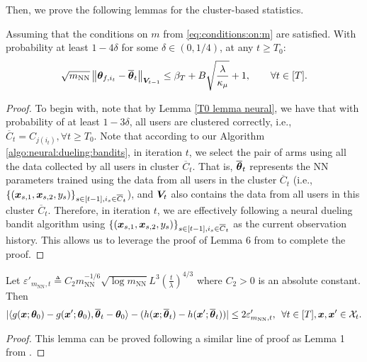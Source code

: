 Then, we prove the following lemmas for the cluster-based statistics.
\begin{lemma}\label{lemma:concentration:theta cluster:neural}
Assuming that the conditions on $m$ from \cref{eq:conditions:on:m} are satisfied.
With probability at least $1-4\delta$ for some $\delta\in(0,1/4)$, at any $t\geq T_0$:
\[
	\sqrt{m_{\text{NN}}} \left\| \boldsymbol{\theta}_{f,i_{t}} - \overline{\boldsymbol{\theta}}_{t} \right\|_{\boldsymbol{V}_{t-1}} \leq  \beta_T + B \sqrt{\frac{\lambda}{\kappa_\mu}} + 1, \qquad \forall t\in[T].
\]
\end{lemma}
\begin{proof}
To begin with, note that by Lemma \ref{T0 lemma neural}, we have that with probability of at least $1-3\delta$, all users are clustered correctly, i.e., $\overline{C}_t=C_{j(i_t)}, \forall t\geq T_0$.
Note that according to our Algorithm \ref{algo:neural:dueling:bandits}, in iteration $t$, we select the pair of arms using all the data collected by all users in cluster $\overline{C}_t$.
That is, $\overline{\boldsymbol{\theta}}_{t}$ represents the NN parameters trained using the data from all users in the cluster $\overline{C}_t$ (i.e., $\{(\boldsymbol{x}_{s,1}, \boldsymbol{x}_{s,2}, y_s)\}_{s\in[t-1], i_s\in \overline C_t}$), and $\boldsymbol{V}_t$ also contains the data from all users in this cluster $\overline{C}_t$.
Therefore, in iteration $t$, we are effectively following a neural dueling bandit algorithm using $\{(\boldsymbol{x}_{s,1}, \boldsymbol{x}_{s,2}, y_s)\}_{s\in[t-1], i_s\in \overline C_t}$ as the current observation history.
This allows us to leverage the proof of Lemma 6 from \citet{verma2024neural} to complete the proof.
\end{proof}

\begin{lemma}
\label{lemma:bound:approx:error:linear:nn:duel}
    Let $\varepsilon'_{m_{\text{NN}},t} \triangleq C_2 m_{\text{NN}}^{-1/6}\sqrt{\log m_{\text{NN}}} L^3 \left(\frac{t}{\lambda}\right)^{4/3}$ where $C_2>0$ is an absolute constant.
    Then
    \[
   		|\langle g(\boldsymbol{x};\boldsymbol{\theta}_0) -g(\boldsymbol{x}';\boldsymbol{\theta}_0), \overline{\boldsymbol{\theta}}_t - \boldsymbol{\theta}_0 \rangle - (h(\boldsymbol{x};\overline{\boldsymbol{\theta}}_t) - h(\boldsymbol{x}';\overline{\boldsymbol{\theta}}_t)) | \leq  2\varepsilon'_{m_{\text{NN}},t}, \,\,\, \forall t\in[T], \boldsymbol{x},\boldsymbol{x}'\in\mathcal{X}_t.
    \]
\end{lemma}
\begin{proof}
This lemma can be proved following a similar line of proof as Lemma 1 from \citet{verma2024neural}.
\end{proof}

